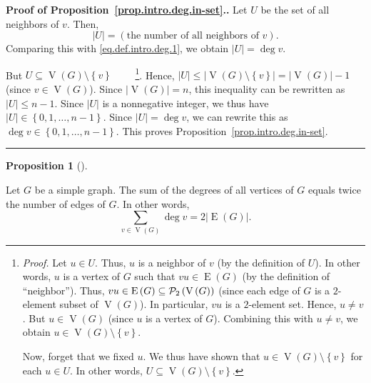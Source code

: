 \documentclass[numbers=enddot,12pt,final,onecolumn,notitlepage]{scrartcl}%
\theoremstyle{definition}
\newtheorem{prop}[theo]{Proposition}
\newenvironment{proposition}[1][]
{\begin{prop}[#1]\begin{leftbar}}
{\end{leftbar}\end{prop}}
\newenvironment{proof}[1][Proof]{\noindent\textbf{#1.} }{\ \rule{0.5em}{0.5em}}
\let\sumnonlimits\sum
\renewcommand{\sum}{\sumnonlimits\limits}
\newcommand{\powset}[2][]{\ifthenelse{\equal{#2}{}}{\mathcal{P}\left(#1\right)}{\mathcal{P}_{#1}\left(#2\right)}}
\newcommand{\set}[1]{\left\{ #1 \right\}}
\newcommand{\abs}[1]{\left| #1 \right|}
\newcommand{\verts}[1]{\operatorname{V}\left( #1 \right)}
\newcommand{\edges}[1]{\operatorname{E}\left( #1 \right)}
\begin{document}
\begin{proof}[Proof of Proposition~\ref{prop.intro.deg.in-set}.]
Let $U$ be the set of all neighbors of $v$. Then,
\[
\abs{U}
= \left(\text{the number of all neighbors of } v\right) .
\]
Comparing
this with \eqref{eq.def.intro.deg.1}, we obtain $\abs{U} = \deg v$.

But $U \subseteq \verts{G} \setminus \set{v}$
\ \ \ \ \footnote{\textit{Proof.} Let $u \in U$. Thus, $u$ is
a neighbor of $v$ (by the definition of $U$). In other words, $u$
is a vertex of $G$ such that $vu \in \edges{G}$ (by the definition
of ``neighbor''). Thus, $vu \in \edges{G} \subseteq
\powset[2]{\verts{G}}$ (since each edge of $G$ is a $2$-element
subset of $\verts{G}$). In particular, $vu$ is a $2$-element set.
Hence, $u \neq v$. But $u \in \verts{G}$ (since $u$ is a vertex of
$G$). Combining this with $u \neq v$, we obtain
$u \in \verts{G} \setminus \set{v}$.

Now, forget that we fixed $u$. We thus have shown that
$u \in \verts{G} \setminus \set{v}$ for each $u \in U$. In other
words, $U \subseteq \verts{G} \setminus \set{v}$.}. Hence,
$\abs{U} \leq \abs{\verts{G} \setminus \set{v}}
= \abs{\verts{G}} - 1$ (since $v \in \verts{G}$). Since
$\abs{\verts{G}} = n$, this inequality can be rewritten as
$\abs{U} \leq n - 1$. Since $\abs{U}$ is a nonnegative integer, we
thus have $\abs{U} \in \set{0, 1, \ldots, n-1}$. Since
$\abs{U} = \deg v$, we can rewrite this as
$\deg v \in \set{0, 1, \ldots, n-1}$. This proves
Proposition~\ref{prop.intro.deg.in-set}.
\end{proof}

\begin{proposition} \label{prop.intro.2n}
Let $G$ be a simple graph.
The sum of the degrees of all vertices of $G$ equals
twice the number of edges of $G$. In other words,
\begin{equation}
\sum_{v \in \verts{G}} \deg v = 2 \abs{\edges{G}} .
\label{eq.prop.intro.2n.main}
\end{equation}
\end{proposition}
\end{document}
